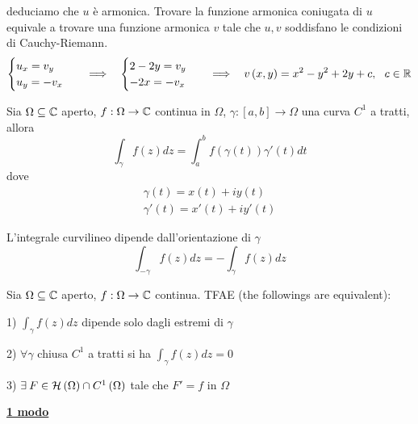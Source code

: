 deduciamo che $u$ è armonica. Trovare la funzione armonica coniugata di $u$ equivale a trovare una funzione armonica $v$ tale che $u,v$ soddisfano le condizioni di Cauchy-Riemann.
\begin{equation*}
\begin{cases}
u_{x} =v_{y}\\
u_{y} =-v_{x}
\end{cases} \ \ \implies \ \ \begin{cases}
2-2y=v_{y}\\
-2x=-v_{x}
\end{cases} \ \ \implies \ \ v\left( x,y\right) =x^{2} -y^{2} +2y+c,\ \ c\in \RR 
\end{equation*}
\Soluzione
\begin{defn}
Sia $\Omega \subseteq \mathbb{C} $ aperto, $f:\Omega \rightarrow \mathbb{C} $ continua in $\Omega $, $\gamma :\left[ a,b\right]\rightarrow \Omega $ una curva $C^{1}$ a tratti, allora
\begin{equation*}
\int\nolimits _{\gamma } f\left( z\right) dz=\int\nolimits ^{b}_{a} f\left( \gamma \left( t\right)\right) \gamma '\left( t\right) dt
\end{equation*}
dove
\begin{gather*}
\gamma \left( t\right) =x\left( t\right) +iy\left( t\right)\\
\gamma '\left( t\right) =x'\left( t\right) +iy'\left( t\right)
\end{gather*}
\end{defn}
\begin{rem}
L'integrale curvilineo dipende dall'orientazione di $\gamma $
\begin{equation*}
\int\nolimits _{-\gamma } f\left( z\right) dz=-\int\nolimits _{\gamma } f\left( z\right) dz
\end{equation*}
\end{rem}
\begin{thm}
Sia $\Omega \subseteq \mathbb{C} $ aperto, $f:\Omega \rightarrow \mathbb{C} $ continua. TFAE (the followings are equivalent):

1) $\int _{\gamma } f\left( z\right) dz$ dipende solo dagli estremi di $\gamma $

2) $\forall \gamma $ chiusa $C^{1}$ a tratti si ha $\int _{\gamma } f\left( z\right) dz=0$

3) $\exists F\in \Hc \left( \Omega \right) \cap C^{1}\left( \Omega \right)$ tale che $F'=f$ in $\Omega $
\end{thm}
\textbf{\underline{1 modo}}
